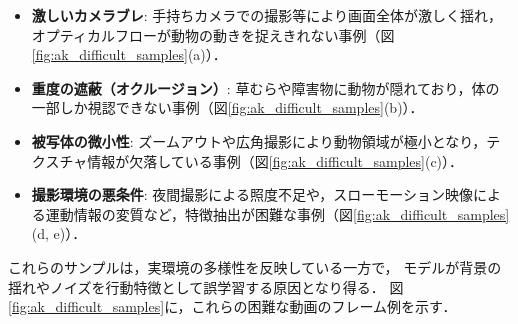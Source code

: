 \begin{itemize}
    \item \textbf{激しいカメラブレ}: 手持ちカメラでの撮影等により画面全体が激しく揺れ，オプティカルフローが動物の動きを捉えきれない事例（図\ref{fig:ak_difficult_samples}(a)）．
    \item \textbf{重度の遮蔽（オクルージョン）}: 草むらや障害物に動物が隠れており，体の一部しか視認できない事例（図\ref{fig:ak_difficult_samples}(b)）．
    \item \textbf{被写体の微小性}: ズームアウトや広角撮影により動物領域が極小となり，テクスチャ情報が欠落している事例（図\ref{fig:ak_difficult_samples}(c)）．
    \item \textbf{撮影環境の悪条件}: 夜間撮影による照度不足や，スローモーション映像による運動情報の変質など，特徴抽出が困難な事例（図\ref{fig:ak_difficult_samples}(d, e)）．
\end{itemize}

これらのサンプルは，実環境の多様性を反映している一方で，
モデルが背景の揺れやノイズを行動特徴として誤学習する原因となり得る．
図\ref{fig:ak_difficult_samples}に，これらの困難な動画のフレーム例を示す．

